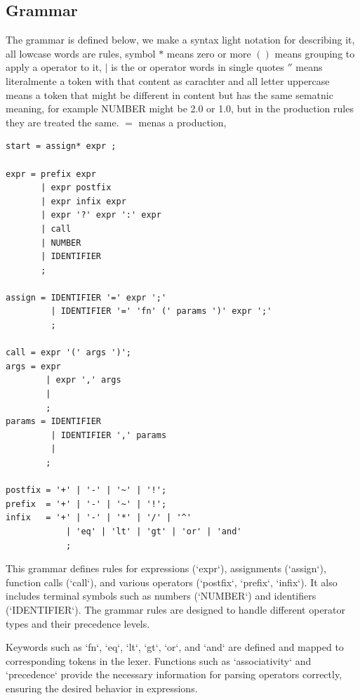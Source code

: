\documentclass[english, 
               brazil, 
               bsc] %
               {dcomp-abntex2}
\begin{document}
\subsection{Grammar}

The grammar is defined below, we make a syntax light notation for describing it, all lowcase words are rules, symbol $*$ means zero or more $()$ means grouping to apply a operator to it, $|$ is the or operator words in single quotes $''$ means literalmente a token with that content as carachter and all letter uppercase means a token that might be different in content but has the same sematnic meaning, for example NUMBER might be 2.0 or 1.0, but in the production rules they are treated the same. $=$ menas a production, 

\begin{verbatim}
start = assign* expr ;

expr = prefix expr 
       | expr postfix  
       | expr infix expr 
       | expr '?' expr ':' expr
       | call
       | NUMBER
       | IDENTIFIER
       ;

assign = IDENTIFIER '=' expr ';'
         | IDENTIFIER '=' 'fn' (' params ')' expr ';'
         ; 

call = expr '(' args ')';
args = expr
        | expr ',' args
        | 
        ;
params = IDENTIFIER
         | IDENTIFIER ',' params
         | 
        ;

postfix = '+' | '-' | '~' | '!';
prefix  = '+' | '-' | '~' | '!';
infix   = '+' | '-' | '*' | '/' | '^'
            | 'eq' | 'lt' | 'gt' | 'or' | 'and'
            ;

\end{verbatim}

This grammar defines rules for expressions (`expr`), assignments (`assign`), function calls (`call`), and various operators (`postfix`, `prefix`, `infix`). It also includes terminal symbols such as numbers (`NUMBER`) and identifiers (`IDENTIFIER`). The grammar rules are designed to handle different operator types and their precedence levels.

Keywords such as `fn`, `eq`, `lt`, `gt`, `or`, and `and` are defined and mapped to corresponding tokens in the lexer. Functions such as `associativity` and `precedence` provide the necessary information for parsing operators correctly, ensuring the desired behavior in expressions.
\end{document}
